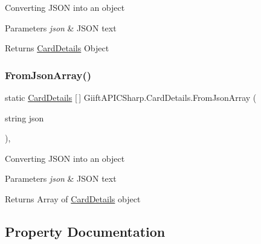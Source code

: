 Converting J\+S\+ON into an object 


\begin{DoxyParams}{Parameters}
{\em json} & J\+S\+ON text\\
\hline
\end{DoxyParams}
\begin{DoxyReturn}{Returns}
\hyperlink{class_giift_a_p_i_c_sharp_1_1_card_details}{Card\+Details} Object
\end{DoxyReturn}
\mbox{\label{class_giift_a_p_i_c_sharp_1_1_card_details_aafd3970ef08a42122c7bec0c776c2e8d}} 
\subsubsection{\texorpdfstring{From\+Json\+Array()}{FromJsonArray()}}
{\footnotesize\ttfamily static \hyperlink{class_giift_a_p_i_c_sharp_1_1_card_details}{Card\+Details} \mbox{[}$\,$\mbox{]} Giift\+A\+P\+I\+C\+Sharp.\+Card\+Details.\+From\+Json\+Array (\begin{DoxyParamCaption}\item[{string}]{json }\end{DoxyParamCaption})\hspace{0.3cm}{\ttfamily [inline]}, {\ttfamily [static]}}



Converting J\+S\+ON into an object 


\begin{DoxyParams}{Parameters}
{\em json} & J\+S\+ON text\\
\hline
\end{DoxyParams}
\begin{DoxyReturn}{Returns}
Array of \hyperlink{class_giift_a_p_i_c_sharp_1_1_card_details}{Card\+Details} object
\end{DoxyReturn}


\subsection{Property Documentation}
\mbox{\label{class_giift_a_p_i_c_sharp_1_1_card_details_af1b2078133dcb298cd0eabe4bc63cda5}} 
